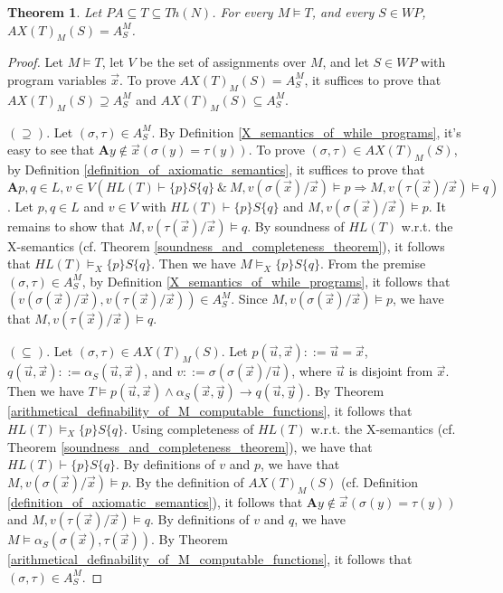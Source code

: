 \documentclass[a4paper,11pt]{article}
\begin{document}
\theoremstyle{plain}
\newtheorem{equivalence_with_axiomatic_semantics}[definition_of_axiomatic_semantics]{Theorem}
\begin{equivalence_with_axiomatic_semantics}
  Let $PA \subseteq T \subseteq Th(N)$. For every $M\models T$, and every $S\in WP$, $AX(T)_M(S) = A_S^M$.
\end{equivalence_with_axiomatic_semantics}
\begin{proof}
  Let $M\models T$, let $V$ be the set of assignments over $M$, and let $S\in WP$ with program variables $\vec{x}$. To prove $AX(T)_M(S) = A_S^M$, it suffices to prove that $AX(T)_M(S) \supseteq A_S^M$ and $AX(T)_M(S) \subseteq A_S^M$.

  $(\supseteq)$. Let $(\sigma, \tau)\in A_S^M$. By Definition \ref{X_semantics_of_while_programs}, it's easy to see that $\textbf{A} y\not\in \vec{x} ( \sigma(y) = \tau(y) )$. To prove $(\sigma, \tau)\in AX(T)_M(S)$, by Definition \ref{definition_of_axiomatic_semantics}, it suffices to prove that $\textbf{A} p,q\in L, v\in V ( HL(T)\vdash \{p\}S\{q\}\ \& \  M,v(\sigma(\vec{x})/\vec{x}) \models p \Rightarrow M,v(\tau(\vec{x})/\vec{x}) \models q )$. Let $p,q\in L$ and $v\in V$ with $HL(T)\vdash \{p\}S\{q\}$ and $M,v(\sigma(\vec{x})/\vec{x}) \models p$. It remains to show that $M,v(\tau(\vec{x})/\vec{x}) \models q$. By soundness of $HL(T)$ w.r.t. the X-semantics (cf. Theorem \ref{soundness_and_completeness_theorem}), it follows that $HL(T) \models_X \{p\}S\{q\}$. Then we have $M \models_X \{p\}S\{q\}$. From the premise $(\sigma, \tau)\in A_S^M$, by Definition \ref{X_semantics_of_while_programs}, it follows that $(v(\sigma(\vec{x})/\vec{x}), v(\tau(\vec{x})/\vec{x}))\in A_S^M$. Since $M,v(\sigma(\vec{x})/\vec{x}) \models p$, we have that $M,v(\tau(\vec{x})/\vec{x}) \models q$.

  $(\subseteq)$. Let $(\sigma, \tau)\in AX(T)_M(S)$. Let $p(\vec{u},\vec{x}) ::= \vec{u} = \vec{x}$, $q(\vec{u},\vec{x}) ::= \alpha_S(\vec{u},\vec{x})$, and $v ::= \sigma(\sigma(\vec{x})/\vec{u})$, where $\vec{u}$ is disjoint from $\vec{x}$. Then we have $T \models p(\vec{u},\vec{x}) \wedge \alpha_S(\vec{x},\vec{y})\rightarrow q(\vec{u},\vec{y})$. By Theorem \ref{arithmetical_definability_of_M_computable_functions}, it follows that $HL(T)\models_X \{p\}S\{q\}$. Using completeness of $HL(T)$ w.r.t. the X-semantics (cf. Theorem \ref{soundness_and_completeness_theorem}), we have that $HL(T)\vdash \{p\}S\{q\}$. By definitions of $v$ and $p$, we have that $M,v(\sigma(\vec{x})/\vec{x}) \models p$. By the definition of $AX(T)_M(S)$ (cf. Definition \ref{definition_of_axiomatic_semantics}), it follows that $\textbf{A} y\not\in \vec{x} ( \sigma(y) = \tau(y) )$ and $M,v(\tau(\vec{x})/\vec{x}) \models q$. By definitions of $v$ and $q$, we have $M\models \alpha_S(\sigma(\vec{x}),\tau(\vec{x}))$. By Theorem \ref{arithmetical_definability_of_M_computable_functions}, it follows that $(\sigma,\tau)\in A_S^M$.
\end{proof}
\end{document}
